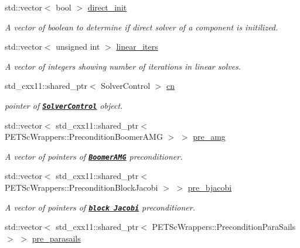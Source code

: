 \begin{DoxyCompactItemize}
std\+::vector$<$ bool $>$ \hyperlink{class_preconditioner_solver_a0241f0b26a8c964fc1e3fd8fef5a20a6}{direct\+\_\+init}
\begin{DoxyCompactList}\small\item\em A vector of boolean to determine if direct solver of a component is initilized. \end{DoxyCompactList}\item 
std\+::vector$<$ unsigned int $>$ \hyperlink{class_preconditioner_solver_a09b25f234ad6a225fb8a002fc919181a}{linear\+\_\+iters}
\begin{DoxyCompactList}\small\item\em A vector of integers showing number of iterations in linear solves. \end{DoxyCompactList}\item 
std\+\_\+cxx11\+::shared\+\_\+ptr$<$ Solver\+Control $>$ \hyperlink{class_preconditioner_solver_a3170128a1c287f729fa40c9aff2f2eed}{cn}
\begin{DoxyCompactList}\small\item\em pointer of \href{https://www.dealii.org/8.4.1/doxygen/deal.II/classSolverControl.html}{\tt {\bfseries Solver\+Control}} object. \end{DoxyCompactList}\item 
std\+::vector$<$ std\+\_\+cxx11\+::shared\+\_\+ptr$<$ P\+E\+T\+Sc\+Wrappers\+::\+Precondition\+Boomer\+A\+MG $>$ $>$ \hyperlink{class_preconditioner_solver_a235b12fcd8e5978c1a3df8c76d05808b}{pre\+\_\+amg}
\begin{DoxyCompactList}\small\item\em A vector of pointers of \href{https://www.dealii.org/8.5.0/doxygen/deal.II/classPETScWrappers_1_1PreconditionBoomerAMG.html}{\tt {\bfseries Boomer\+A\+MG}} preconditioner. \end{DoxyCompactList}\item 
std\+::vector$<$ std\+\_\+cxx11\+::shared\+\_\+ptr$<$ P\+E\+T\+Sc\+Wrappers\+::\+Precondition\+Block\+Jacobi $>$ $>$ \hyperlink{class_preconditioner_solver_af3d0217e39b9527c67ac6ce56464f11a}{pre\+\_\+bjacobi}
\begin{DoxyCompactList}\small\item\em A vector of pointers of \href{https://www.dealii.org/8.5.0/doxygen/deal.II/classPETScWrappers_1_1PreconditionBlockJacobi.html}{\tt {\bfseries block Jacobi}} preconditioner. \end{DoxyCompactList}\item 
std\+::vector$<$ std\+\_\+cxx11\+::shared\+\_\+ptr$<$ P\+E\+T\+Sc\+Wrappers\+::\+Precondition\+Para\+Sails $>$ $>$ \hyperlink{class_preconditioner_solver_a90b15442f60786b56729f2756e191336}{pre\+\_\+parasails}

\end{DoxyCompactItemize}
